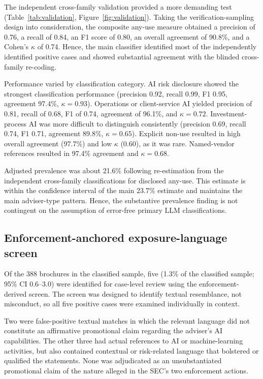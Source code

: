 \documentclass[utf8]{FrontiersinHarvard}
\begin{document}
The independent cross-family validation provided a more demanding test (Table~\ref{tab:validation}, Figure~\ref{fig:validation}). Taking the verification-sampling design into consideration, the composite any-use measure obtained a precision of 0.76, a recall of 0.84, an F1 score of 0.80, an overall agreement of 90.8\%, and a Cohen's $\kappa$ of 0.74. Hence, the main classifier identified most of the independently identified positive cases and showed substantial agreement with the blinded cross-family re-coding.

Performance varied by classification category. AI risk disclosure showed the strongest classification performance (precision 0.92, recall 0.99, F1 0.95, agreement 97.4\%, $\kappa = 0.93$). Operations or client-service AI yielded precision of 0.81, recall of 0.68, F1 of 0.74, agreement of 96.1\%, and $\kappa = 0.72$. Investment-process AI was more difficult to distinguish consistently (precision 0.69, recall 0.74, F1 0.71, agreement 89.8\%, $\kappa = 0.65$). Explicit non-use resulted in high overall agreement (97.7\%) and low $\kappa$ (0.60), as it was rare. Named-vendor references resulted in 97.4\% agreement and $\kappa = 0.68$.

Adjusted prevalence was about 21.6\% following re-estimation from the independent cross-family classifications for disclosed any-use. This estimate is within the confidence interval of the main 23.7\% estimate and maintains the main adviser-type pattern. Hence, the substantive prevalence finding is not contingent on the assumption of error-free primary LLM classifications.

\subsection{Enforcement-anchored exposure-language screen}

Of the 388 brochures in the classified sample, five (1.3\% of the classified sample; 95\% CI 0.6--3.0) were identified for case-level review using the enforcement-derived screen. The screen was designed to identify textual resemblance, not misconduct, so all five positive cases were examined individually in context.

Two were false-positive textual matches in which the relevant language did not constitute an affirmative promotional claim regarding the adviser's AI capabilities. The other three had actual references to AI or machine-learning activities, but also contained contextual or risk-related language that bolstered or qualified the statements. None was adjudicated as an unsubstantiated promotional claim of the nature alleged in the SEC's two enforcement actions.
\end{document}
